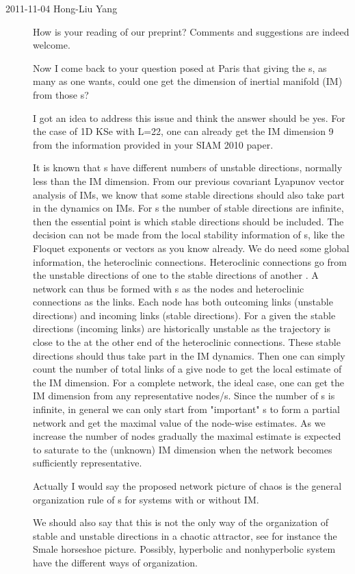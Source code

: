 \begin{description}
\item[2011-11-04  Hong-Liu Yang]
	
How is your reading of our preprint? Comments and suggestions are indeed welcome.

Now I come back to your question posed at Paris that giving the \po s, as
many as one wants, could one get the dimension of inertial manifold (IM)
from those \po s?

I got an idea to address this issue and think the answer should be yes.
For the case of 1D KSe with L=22, one can already get the IM dimension 9
from the information provided in your SIAM 2010 paper.

It is known that \po s have different numbers of unstable directions,
normally less than the IM dimension. From our previous covariant Lyapunov
vector analysis of IMs, we know that some stable directions should also
take part in the dynamics on IMs. For \po s the number of stable
directions are infinite, then the essential point is which stable
directions should be included. The decision can not be made from the
local stability information of \po s, like the Floquet exponents or
vectors as you know already. We do need some global information, the
heteroclinic connections. Heteroclinic connections go from the unstable
directions of one \po  to the stable directions of another \po. A network
can thus be formed with \po s as the nodes and heteroclinic connections as
the links. Each node has both outcoming links (unstable directions) and
incoming links (stable directions). For a given \po  the stable directions
(incoming links) are historically unstable as the trajectory is close to
the \po  at the other end of the heteroclinic connections. These stable
directions should thus take part in the IM dynamics. Then one can simply
count the number of total links of a give node to get the local estimate
of the IM dimension. For a complete network, the ideal case, one can get
the IM dimension from any representative nodes/\po s. Since the number of
\po s is infinite, in general we can only start from "important" \po s to
form a partial network and get the maximal value of the node-wise
estimates. As we increase the number of nodes gradually the maximal
estimate is expected to saturate to the (unknown) IM dimension when the
network becomes sufficiently representative.

Actually I would say the proposed network picture of chaos is the general
organization rule of \po s for systems with or without IM.

We should also say that this is not the only way of the organization of
stable and unstable directions in a chaotic attractor, see for instance
the Smale horseshoe picture. Possibly, hyperbolic and nonhyperbolic
system have the different ways of organization.


\end{description}

